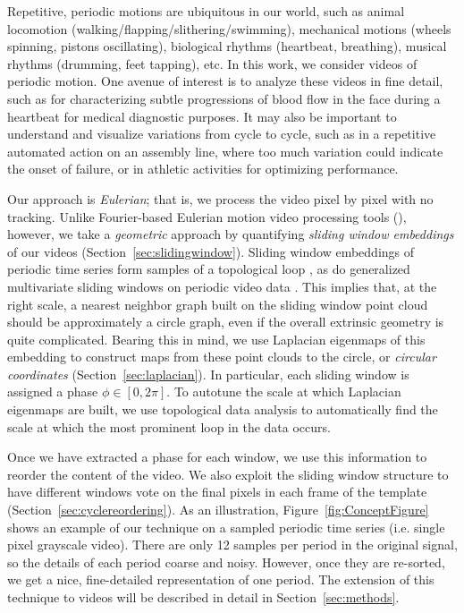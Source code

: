 \documentclass{article}
\begin{document}
Repetitive, periodic motions are ubiquitous in our world, such as animal locomotion (walking/flapping/slithering/swimming), mechanical motions (wheels spinning, pistons oscillating), biological rhythms (heartbeat, breathing), musical rhythms (drumming, feet tapping), etc.  In this work, we consider videos of periodic motion.  One avenue of interest is to analyze these videos in fine detail, such as for characterizing subtle progressions of blood flow in the face during a heartbeat for medical diagnostic purposes.  It may also be important to understand and visualize variations from cycle to cycle, such as in a repetitive automated action on an assembly line, where too much variation could indicate the onset of failure, or in athletic activities for optimizing performance.  

Our approach is {\em Eulerian}; that is, we process the video pixel by pixel with no tracking.  Unlike Fourier-based Eulerian motion video processing tools (\cite{wu2012eulerian, wadhwa2013phase}), however, we take a {\em geometric} approach by quantifying {\em sliding window embeddings} of our videos (Section~\ref{sec:slidingwindow}).  Sliding window embeddings of periodic time series form samples of a topological loop \cite{perea2015sliding}, as do generalized multivariate sliding windows on periodic video data \cite{traliehigh, tralie2017quasi}.  This implies that, at the right scale, a nearest neighbor graph built on the sliding window point cloud should be approximately a circle graph, even if the overall extrinsic geometry is quite complicated.  Bearing this in mind, we use Laplacian eigenmaps \cite{belkin2003laplacian} of this embedding to construct maps from these point clouds to the circle, or {\em circular coordinates} (Section~\ref{sec:laplacian}).  In particular, each sliding window is assigned a phase $\phi \in [0, 2\pi]$.  To autotune the scale at which Laplacian eigenmaps are built, we use topological data analysis \cite{edelsbrunner2000topological,edelsbrunner2008persistent,edelsbrunner2010computational,carlsson2009topology,ghrist2014elementary} to automatically find the scale at which the most prominent loop in the data occurs.

Once we have extracted a phase for each window, we use this information to reorder the content of the video.  We also exploit the sliding window structure to have different windows vote on the final pixels in each frame of the template (Section~\ref{sec:cyclereordering}).  As an illustration, Figure~\ref{fig:ConceptFigure} shows an example of our technique on a sampled periodic time series (i.e. single pixel grayscale video).  There are only 12 samples per period in the original signal, so the details of each period coarse and noisy.  However, once they are re-sorted, we get a nice, fine-detailed representation of one period.  The extension of this technique to videos will be described in detail in Section~\ref{sec:methods}.
\end{document}
